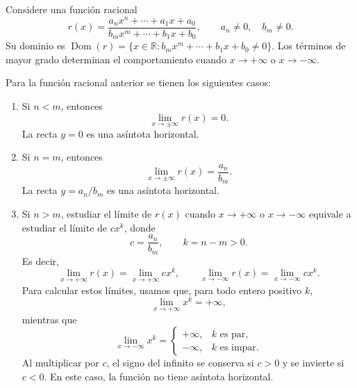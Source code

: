 \documentclass[10pt,a5paper]{article}
\begin{document}
Considere una función racional
\[
  r(x)=\frac{a_nx^n+\cdots+a_1x+a_0}
             {b_mx^m+\cdots+b_1x+b_0},
  \qquad
  a_n\neq0,
  \quad
  b_m\neq0.
\]
Su dominio es $\operatorname{Dom}(r)=\{x\in\mathbb{R}:b_mx^m+\cdots+b_1x+b_0\neq0\}$. Los términos de mayor grado determinan el comportamiento cuando $x\to+\infty$ o $x\to-\infty$.

\begin{proposicion}
Para la función racional anterior se tienen los siguientes casos:
\begin{enumerate}
  \item Si $n<m$, entonces
  \[
    \lim_{x\to\pm\infty}r(x)=0.
  \]
  La recta $y=0$ es una asíntota horizontal.
  \item Si $n=m$, entonces
  \[
    \lim_{x\to\pm\infty}r(x)=\frac{a_n}{b_m}.
  \]
  La recta $y=a_n/b_m$ es una asíntota horizontal.
  \item Si $n>m$, estudiar el límite de $r(x)$ cuando $x\to+\infty$ o $x\to-\infty$ equivale a estudiar el límite de $cx^k$, donde
  \[
    c=\frac{a_n}{b_m},\qquad k=n-m>0.
  \]
  Es decir,
  \[
    \lim_{x\to+\infty}r(x)=\lim_{x\to+\infty}cx^k,
    \qquad
    \lim_{x\to-\infty}r(x)=\lim_{x\to-\infty}cx^k.
  \]
  Para calcular estos límites, usamos que, para todo entero positivo $k$,
  \[
    \lim_{x\to+\infty}x^k=+\infty,
  \]
  mientras que
  \[
    \lim_{x\to-\infty}x^k=
    \begin{cases}
      +\infty, & k\text{ es par},\\
      -\infty, & k\text{ es impar}.
    \end{cases}
  \]
  Al multiplicar por $c$, el signo del infinito se conserva si $c>0$ y se invierte si $c<0$. En este caso, la función no tiene asíntota horizontal.
\end{enumerate}
\end{proposicion}
\end{document}

